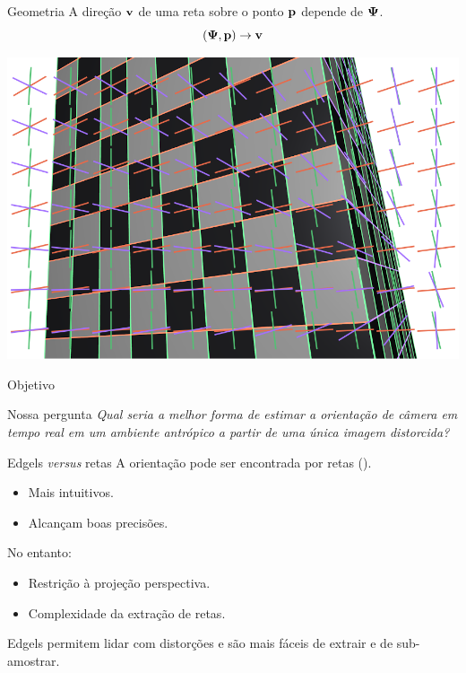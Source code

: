 \begin{frame}{Geometria}
  A direção ${\mathbf{v}}$ de uma reta sobre o ponto ${\mathbf{p}}$ depende de ${\boldsymbol{\Psi}}$.
  \[
  ({\boldsymbol{\Psi}},{\mathbf{p}}) \rightarrow {\mathbf{v}}
  \]

  \centerline{\includegraphics[height=10\baselineskip]{canim0117.png}}

  \hfill{}
\end{frame}



\begin{frame}{Objetivo}
  \begin{block}{Nossa pergunta}
    {\em Qual seria a melhor forma de estimar a orientação de câmera em
      \alert<2>{tempo real} em um ambiente antrópico a partir de uma única
      \alert<2>{imagem distorcida}?}
  \end{block}
\end{frame}


\begin{frame}{Edgels {\em versus} retas}
  A orientação pode ser encontrada por retas
  (\cite{Caprile1990,Cipolla1999,Rother2002}).\\ %
  \begin{itemize}
  \item Mais intuitivos.
  \item Alcançam boas precisões.
  \end{itemize}

 No entanto:\\
  \begin{itemize}
  \item Restrição à projeção perspectiva.
  \item Complexidade da extração de retas.%
  \end{itemize}

  Edgels permitem lidar com distorções e são mais fáceis de extrair e de sub-amostrar.
\end{frame}


